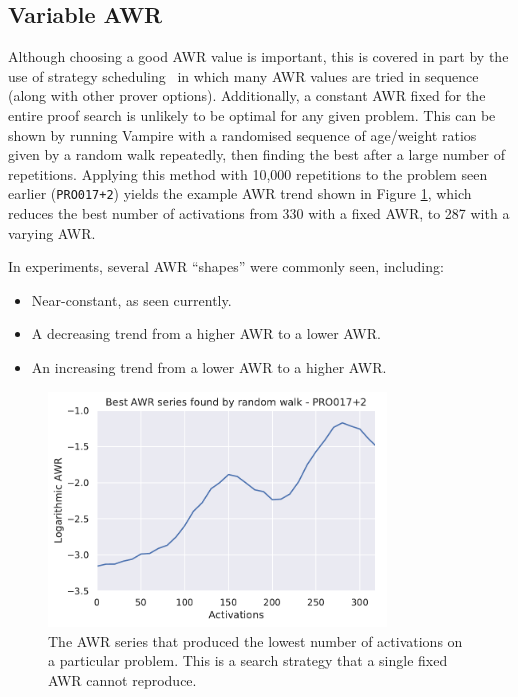 \documentclass{llncs}
\begin{document}
\subsection{Variable AWR}
Although choosing a good AWR value is important, this is covered in part by the use of strategy scheduling~\cite{CADE18} in which many AWR values are tried in sequence (along with other prover options).
Additionally, a constant AWR fixed for the entire proof search is unlikely to be optimal for any given problem.
This can be shown by running Vampire with a randomised sequence of age/weight ratios given by a random walk repeatedly, then finding the best after a large number of repetitions.
Applying this method with 10,000 repetitions to the problem seen earlier (\texttt{PRO017+2}) yields the example AWR trend shown in Figure \ref{fig:random-walk}, which reduces the best number of activations from 330 with a fixed AWR, to 287 with a varying AWR.

In experiments, several AWR ``shapes'' were commonly seen, including:
\begin{itemize}
	\item Near-constant, as seen currently.
	\item A decreasing trend from a higher AWR to a lower AWR.
	\item An increasing trend from a lower AWR to a higher AWR.
\end{itemize}

\begin{figure}
	\centering
	\includegraphics[width=0.8\textwidth]{random-walk}
	\caption{The AWR series that produced the lowest number of activations on a particular problem. This is a search strategy that a single fixed AWR cannot reproduce.}
	\label{fig:random-walk}
\end{figure}
\end{document}

